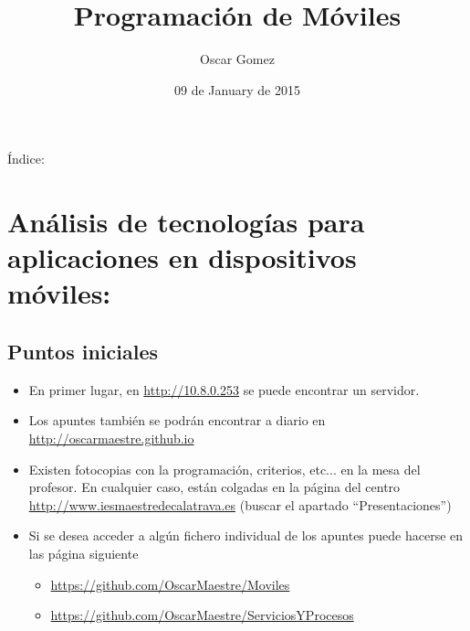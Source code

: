 \documentclass[a4paper,12pt,spanish]{sphinxmanual}
\title{Programación de Móviles}
\date{09 de January de 2015}
\author{Oscar Gomez}
\begin{document}
\maketitle
\tableofcontents
{}\label{index::doc}


Índice:


\chapter{Análisis de tecnologías para aplicaciones en dispositivos móviles:}
\label{tema1::doc}\label{tema1:analisis-de-tecnologias-para-aplicaciones-en-dispositivos-moviles}\label{tema1:prog-multimedia-y-de-dispositivos-moviles}

\section{Puntos iniciales}
\label{tema1:puntos-iniciales}\begin{itemize}
\item {} 
En primer lugar, en \href{http://10.8.0.253}{http://10.8.0.253} se puede encontrar un servidor.

\item {} 
Los apuntes también se podrán encontrar a diario en \href{http://oscarmaestre.github.io}{http://oscarmaestre.github.io}

\item {} 
Existen fotocopias con la programación, criterios, etc... en la mesa del profesor. En cualquier caso, están colgadas en la página del centro \href{http://www.iesmaestredecalatrava.es}{http://www.iesmaestredecalatrava.es} (buscar el apartado ``Presentaciones'')

\item {} 
Si se desea acceder a algún fichero individual de los apuntes puede hacerse en las página siguiente
\begin{itemize}
\item {} 
\href{https://github.com/OscarMaestre/Moviles}{https://github.com/OscarMaestre/Moviles}

\item {} 
\href{https://github.com/OscarMaestre/ServiciosYProcesos}{https://github.com/OscarMaestre/ServiciosYProcesos}

\end{itemize}

\end{itemize}
\end{document}
